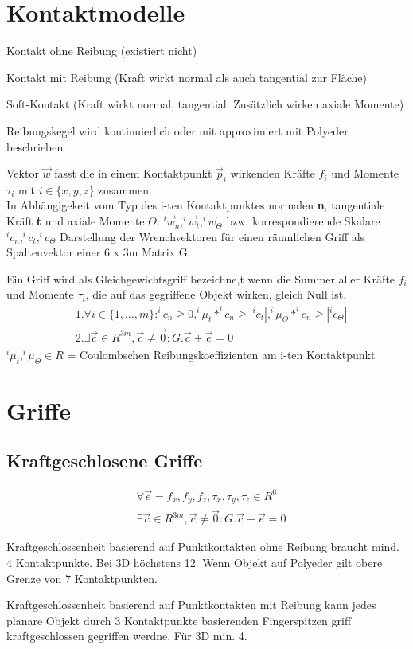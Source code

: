 \section{Kontaktmodelle}
\begin{compactitem}
    \item Kontakt ohne Reibung (existiert nicht)
    \item Kontakt mit Reibung (Kraft wirkt normal als auch tangential zur Fläche)
    \item Soft-Kontakt (Kraft wirkt normal, tangential. Zusätzlich wirken axiale Momente)
\end{compactitem}
Reibungskegel wird kontinuierlich oder mit approximiert mit Polyeder beschrieben

Vektor $\vec{w}$ fasst die in einem Kontaktpunkt $\vec{p}_i$ wirkenden Kräfte $f_i$ und Momente
$\tau_i$ mit $i \in \{x,y,z\}$ zusammen. \\
In Abhängigekeit vom Typ des i-ten Kontaktpunktes normalen \textbf{n}, tangentiale Kräft \textbf{t} und
axiale Momente \textbf{$\Theta$}: $^i\vec{w}_n, ^i\vec{w}_t, ^i\vec{w}_\Theta$ bzw. korrespondierende
Skalare $^ic_n, ^ic_t, ^ic_\Theta$
Darstellung der Wrenchvektoren für einen räumlichen Griff als Spaltenvektor einer 6 x 3m Matrix G.

Ein Griff wird als Gleichgewichtsgriff bezeichne,t wenn die Summer aller Kräfte $f_i$ und Momente
$\tau_i$, die auf das gegriffene Objekt wirken, gleich Null ist.
\begin{align}
    &1. \forall i \in \{1, ...,m\} : ^ic_n \geq 0, ^i\mu_t * ^ic_n \geq |^ic_t|, ^i\mu_\Theta * ^ic_n
    \geq |^ic_\Theta| \\
    &2. \exists \vec{c} \in R^{3m}, \vec{c} \neq \vec{0} : G.\vec{c} + \vec{e} = 0
\end{align}
$^i\mu_t, ^i\mu_\Theta \in R$ = Coulombschen Reibungskoeffizienten am i-ten Kontaktpunkt

\section{Griffe}
\subsection{Kraftgeschlosene Griffe}
\begin{align}
    & \forall \vec{e} = {f_x, f_y, f_z, \tau_x, \tau_y, \tau_z} \in R^6 \\
    & \exists \vec{c} \in R^{3m}, \vec{c} \neq \vec{0} : G.\vec{c} + \vec{e} = 0
\end{align}
\begin{compactitem}
    \item Kraftgeschlossenheit basierend auf Punktkontakten ohne Reibung braucht mind. 4 Kontaktpunkte.
    Bei 3D höchstens 12. Wenn Objekt auf Polyeder gilt obere Grenze von 7 Kontaktpunkten.
    \item Kraftgeschlossenheit basierend auf Punktkontakten mit Reibung kann jedes planare Objekt durch
    3 Kontaktpunkte basierenden Fingerspitzen griff kraftgeschlossen gegriffen werdne. Für 3D min. 4.
\end{compactitem}
